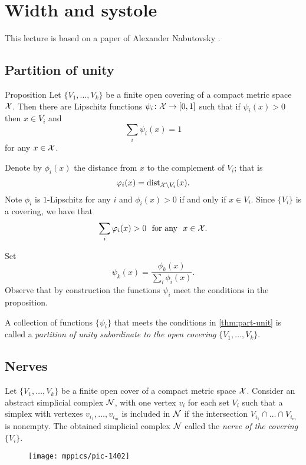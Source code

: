 \chapter{Width and systole}

This lecture is based on a paper of Alexander Nabutovsky \cite{nabutovsky}.

\section{Partition of unity}

\begin{thm}{Proposition}\label{thm:part-unit}
 Let $\{V_1,\dots,V_k\}$ be a finite open covering of a compact metric space ${\mathcal{X}}$.
Then there are Lipschitz functions $\psi_i\:{\spc{X}}\z\to[0,1]$ such that
if $\psi_i(x)>0$ then $x\in V_i$ and
$$\sum_i\psi_i(x)=1$$
for any $x\in {\mathcal{X}}$.
\end{thm}

Denote by $\phi_i(x)$ the distance from $x$ to the complement of $V_i$;
that is
$$\varphi_i(x)=\mathrm{dist}_{{\mathcal{X}}\backslash V_i}(x).$$
Note $\phi_i$ is $1$-Lipschitz
for any $i$
and $\phi_i(x)>0$ if and only if $x\in V_i$.
Since $\{V_i\}$ is a covering, we have that
$$\sum_i\varphi_i(x)>0\ \ \text{for any}\ \ x\in {\mathcal{X}}.$$

Set 
$$\psi_k(x)=\frac{\phi_k(x)}{\sum_i\phi_i(x)}.$$
Observe that by construction the functions $\psi_i$ meet the conditions in the proposition.
\qedsf

A collection of functions $\{\psi_i\}$ that meets the conditions in \ref{thm:part-unit} is called 
a \emph{partition of unity subordinate to the open covering} $\{V_1,\dots,V_k\}$.

\section{Nerves}

Let $\{V_1,\dots,V_k\}$ be a finite open cover of a compact metric space $\mathcal{X}$.
Consider an abstract simplicial complex $\mathcal{N}$, with one vertex $v_i$ for each set $V_i$ such that a simplex with vertexes $v_{i_1},\dots, v_{i_m}$ is included in $\mathcal{N}$ if 
the intersection $V_{i_1}\cap\dots\cap V_{i_m}$ is nonempty.
The obtained simplicial complex $\mathcal{N}$ called the \emph{nerve of the covering $\{V_i\}$}.

\begin{figure}[h!]
\vskip-0mm
\centering
\texttt{[image: mppics/pic-1402]}
\end{figure}

